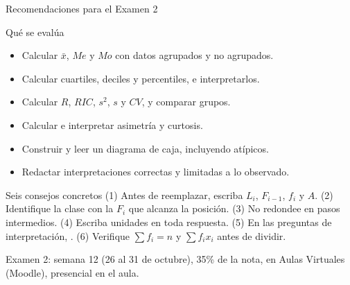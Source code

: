 \documentclass[aspectratio=169,10pt]{beamer}
\begin{document}
\begin{frame}{Recomendaciones para el Examen 2}
  \begin{block}{Qué se evalúa}
    \tiny
    \begin{itemize}\setlength{\itemsep}{-0.02cm}
      \item Calcular $\bar{x}$, $Me$ y $Mo$ con datos agrupados y no agrupados.
      \item Calcular cuartiles, deciles y percentiles, e interpretarlos.
      \item Calcular $R$, $RIC$, $s^2$, $s$ y $CV$, y comparar grupos.
      \item Calcular e interpretar asimetría y curtosis.
      \item Construir y leer un diagrama de caja, incluyendo atípicos.
      \item Redactar interpretaciones correctas y limitadas a lo observado.
    \end{itemize}
  \end{block}

  \vspace{0.1cm}
  \begin{alertblock}{Seis consejos concretos}
    \tiny
    (1) Antes de reemplazar, escriba $L_i$, $F_{i-1}$, $f_i$ y $A$. \quad
    (2) Identifique la clase con la  $F_i$ que alcanza la
    posición. \quad (3) No redondee en pasos intermedios. \quad
    (4) Escriba unidades en toda respuesta. \quad (5) En las preguntas de
    interpretación, . \quad (6) Verifique
    $\sum f_i = n$ y $\sum f_ix_i$ antes de dividir.
  \end{alertblock}

  \vspace{0.05cm}
  {\tiny\color{uniGris} Examen 2: semana 12 (26 al 31 de octubre), 35\% de la
  nota, en Aulas Virtuales (Moodle), presencial en el aula.}
\end{frame}
\end{document}
